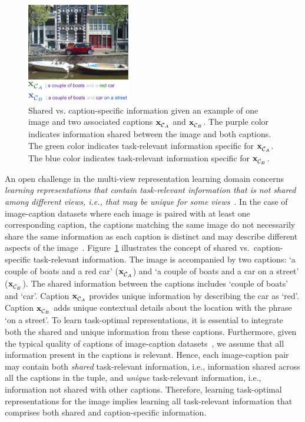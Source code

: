 \begin{figure}
	\centering
	\includegraphics[width=0.4\textwidth]{figures/shared-vs-unique-v2}
	\caption{
	Shared vs. caption-specific information given an example of one image and two associated captions $\mathbf{x}_{\mathcal{C}_{A}}^{}$ and $\mathbf{x}_{\mathcal{C}_{B}}^{}$.
	The purple color indicates information shared between the image and both captions.
	The green color indicates task-relevant information specific for $\mathbf{x}_{\mathcal{C}_{A}}^{}$.
	The blue color indicates task-relevant information specific for $\mathbf{x}_{\mathcal{C}_{B}}^{}$.
	}
	\label{fig:shared-vs-specific}
\end{figure}

An open challenge in the multi-view representation learning domain concerns \emph{learning representations that contain task-relevant information that is not shared among different views, i.e., that may be unique for some views}~\citep{shwartz2023compress, zong2023self}.
In the case of image-caption datasets where each image is paired with at least one corresponding caption, the captions matching the same image do not necessarily share the same information as each caption is distinct and may describe different aspects of the image~\citep{biten2022_is}.
Figure~\ref{fig:shared-vs-specific} illustrates the concept of shared vs.\ caption-specific task-relevant information.
The image is accompanied by two captions: `a couple of boats and a red car' ($\mathbf{x}_{\mathcal{C}_{A}}^{}$) and `a couple of boats and a car on a street' ($\mathbf{x}_{\mathcal{C}_{B}}^{}$).
The shared information between the captions includes `couple of boats' and `car'.
Caption $\mathbf{x}_{\mathcal{C}_{A}}^{}$ provides unique information by describing the car as `red'. Caption $\mathbf{x}_{\mathcal{C}_{B}}^{}$ adds unique contextual details about the location with the phrase `on a street'.
To learn task-optimal representations, it is essential to integrate both the shared and unique information from these captions.
Furthermore, given the typical quality of captions of image-caption datasets~\citep{chen2015microsoft}, we assume that all information present in the captions is relevant.
Hence, each image-caption pair may contain both \emph{shared} task-relevant information, i.e., information shared across all the captions in the tuple, and \emph{unique} task-relevant information, i.e., information not shared with other captions.
Therefore, learning task-optimal representations for the image implies learning all task-relevant information that comprises both shared and caption-specific information.

